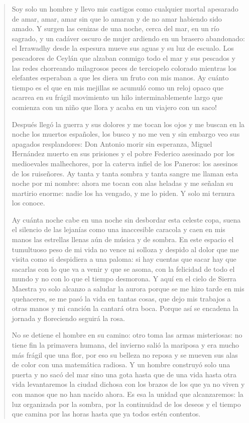 \documentclass[12pt]{article}
\begin{document}
\begin{verse}
Soy solo un hombre y llevo mis castigos  
como cualquier mortal apesarado  
de amar, amar, amar sin que lo amaran  
y de no amar habiendo sido amado.  
Y surgen las cenizas de una noche,  
cerca del mar, en un río sagrado,  
y un cadáver oscuro de mujer  
ardiendo en un brasero abandonado:  
el Irrawadhy desde la espesura  
mueve sus aguas y su luz de escualo.  
Los pescadores de Ceylán que alzaban  
conmigo todo el mar y sus pescados  
y las redes chorreando milagrosos  
peces de terciopelo colorado  
mientras los elefantes esperaban  
a que les diera un fruto con mis manos.  
Ay cuánto tiempo es el que en mis mejillas  
se acumuló como un reloj opaco  
que acarrea en su frágil movimiento  
un hilo interminablemente largo  
que comienza con un niño que llora  
y acaba en un viajero con un saco!  

Después llegó la guerra y sus dolores  
y me tocan los ojos y me buscan  
en la noche los muertos españoles,  
los busco y no me ven y sin embargo  
veo sus apagados resplandores:  
Don Antonio morir sin esperanza,  
Miguel Hernández muerto en sus prisiones  
y el pobre Federico asesinado  
por los medioevales malhechores,  
por la caterva infiel de los Paneros:  
los asesinos de los ruiseñores.  
Ay tanta y tanta sombra y tanta sangre  
me llaman esta noche por mi nombre:  
ahora me tocan con alas heladas  
y me señalan su martirio enorme:  
nadie los ha vengado, y me lo piden.  
Y solo mi ternura los conoce.  

Ay cuánta noche cabe en una noche  
sin desbordar esta celeste copa,  
suena el silencio de las lejanías  
como una inaccesible caracola  
y caen en mis manos las estrellas  
llenas aún de música y de sombra.  
En este espacio el tumultuoso peso  
de mi vida no vence ni solloza  
y despido al dolor que me visita  
como si despidiera a una paloma:  
si hay cuentas que sacar hay que sacarlas  
con lo que va a venir y que se asoma,  
con la felicidad de todo el mundo  
y no con lo que el tiempo desmorona.  
Y aquí en el cielo de Sierra Maestra  
yo solo alcanzo a saludar la aurora  
porque se me hizo tarde en mis quehaceres,  
se me pasó la vida en tantas cosas,  
que dejo mis trabajos a otras manos  
y mi canción la cantará otra boca.  
Porque así se encadena la jornada  
y floreciendo seguirá la rosa.  

No se detiene el hombre en su camino:  
otro toma las armas misteriosas:  
no tiene fin la primavera humana,  
del invierno salió la mariposa  
y era mucho más frágil que una flor,  
por eso su belleza no reposa  
y se mueven sus alas de color  
con una matemática radiosa.  
Y un hombre construyó solo una puerta  
y no sacó del mar sino una gota  
hasta que de una vida hasta otra vida  
levantaremos la ciudad dichosa  
con los brazos de los que ya no viven  
y con manos que no han nacido ahora.  
Es esa la unidad que alcanzaremos:  
la luz organizada por la sombra,  
por la continuidad de los deseos  
y el tiempo que camina por las horas  
hasta que ya todos estén contentos.  


\end{verse}
\end{document}
